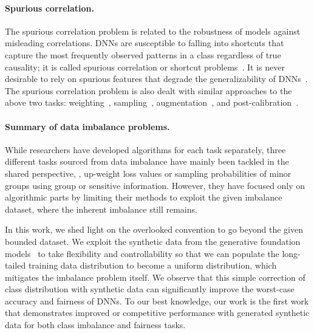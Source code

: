 \paragraph{Spurious correlation.}
The spurious correlation problem is related to the robustness of models against misleading correlations.
DNNs are susceptible to falling into shortcuts that capture the most frequently observed patterns in a class regardless of true causality;
it is called spurious correlation or shortcut problems~\cite{geirhos2020shortcut, scimeca2022iclr, kirichenko2023last}.
It is never desirable to rely on spurious features that degrade the generalizability of DNNs~\cite{sagawa2019distributionally, liu2015deep}.
The spurious correlation problem is also dealt with similar approaches to the above two tasks: weighting~\cite{sagawa2019distributionally,LfF,kim2022learning}, sampling~\cite{idrissi2022simple, sagawa2020investigation}, augmentation~\cite{lee2021learning,yao2022improving,hwang2022selecmix}, and post-calibration~\cite{liu2021just, kirichenko2023last, lee2022surgical}.


\paragraph{Summary of data imbalance problems.}
While researchers have developed algorithms for each task separately, three different tasks sourced from data imbalance have mainly been tackled in the shared perspective, \ie, 
up-weight loss values or sampling probabilities of minor groups using group or sensitive information.
However, they have focused only on algorithmic parts by limiting their methods to exploit the given imbalance dataset, where the inherent imbalance still remains.

In this work, we shed light on the overlooked convention to go beyond the given bounded dataset.
We exploit the synthetic data from the generative foundation models~\cite{rombach2022high, saharia2022photorealistic, nichol2021glide} to take flexibility and controllability so that we can populate the long-tailed training data distribution to become a uniform distribution, which mitigates the imbalance problem itself.
We observe that this simple correction of class distribution with synthetic data can significantly improve the worst-case accuracy and fairness of DNNs.
To our best knowledge, our work is the first work that demonstrates improved or competitive performance with generated synthetic data for both class imbalance and fairness tasks.

